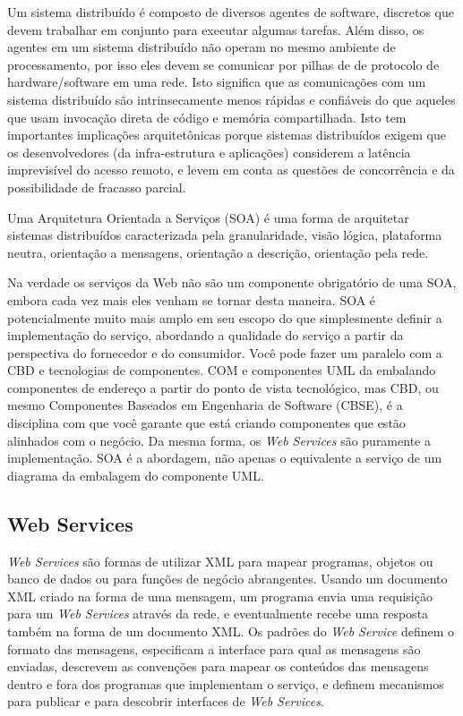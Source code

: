 \documentclass{acm_proc_article-sp}
\begin{document}
		Um sistema distribuído é composto de diversos agentes de software, discretos que devem trabalhar em conjunto para executar algumas tarefas. Além disso, os agentes em um sistema distribuído não operam no mesmo ambiente de processamento, por isso eles devem se comunicar por pilhas de de protocolo de hardware/software em uma rede. Isto significa que as comunicações com um sistema distribuído são intrinsecamente menos rápidas e confiáveis do que aqueles que usam invocação direta de código e memória compartilhada. Isto tem importantes implicações arquitetônicas porque sistemas distribuídos exigem que os desenvolvedores (da infra-estrutura e aplicações) considerem a latência imprevisível do acesso remoto, e levem em conta as questões de concorrência e da possibilidade de fracasso parcial.
		
		Uma Arquitetura Orientada a Serviços (SOA) é uma forma de arquitetar sistemas distribuídos caracterizada pela granularidade, visão lógica, plataforma neutra, orientação a mensagens, orientação a descrição, orientação pela rede.\cite{SOA-W3C}
		
		Na verdade os serviços da Web não são um componente obrigatório de uma SOA, embora cada vez mais eles venham se tornar desta maneira. SOA é potencialmente muito mais amplo em seu escopo do que simplesmente definir a implementação do serviço, abordando a qualidade do serviço a partir da perspectiva do fornecedor e do consumidor. Você pode fazer um paralelo com a CBD e tecnologias de componentes. COM e componentes UML da embalando componentes de endereço a partir do ponto de vista tecnológico, mas CBD, ou mesmo Componentes Baseados em Engenharia de Software (CBSE), é a disciplina com que você garante que está criando componentes que estão alinhados com o negócio. Da mesma forma, os \emph{Web Services} são puramente a implementação. SOA é a abordagem, não apenas o equivalente a serviço de um diagrama da embalagem do componente UML.\cite{SOA-Microsoft}
		
	\subsection{Web Services}
		
		\emph{Web Services} são formas de utilizar XML para mapear programas, objetos ou banco de dados ou para funções de negócio abrangentes. Usando um documento XML criado na forma de uma mensagem, um programa envia uma requisição para um \emph{Web Services} através da rede, e eventualmente recebe uma resposta também na forma de um documento XML. Os padrões do \emph{Web Service} definem o formato das mensagens, especificam a interface para qual as mensagens são enviadas, descrevem as convenções para mapear os conteúdos das mensagens dentro e fora dos programas que implementam o serviço, e definem mecanismos para publicar e para descobrir interfaces de \emph{Web Services}.
		
\end{document}
